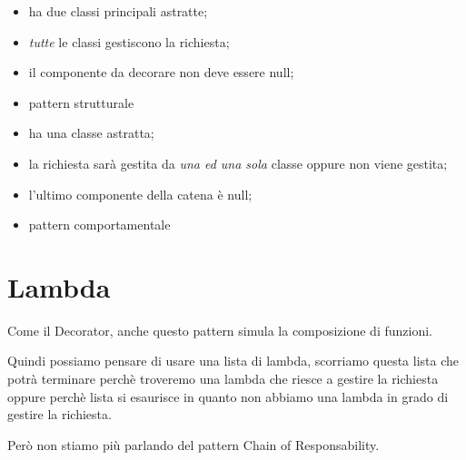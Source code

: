 \begin{multicols}{2}
    \begin{itemize}
        \item [] ha due classi principali astratte;
        \item [] \textit{tutte} le classi gestiscono la richiesta;
        \item [] il componente da decorare non deve essere null;
        \item [] pattern strutturale
    \end{itemize}
\columnbreak
    \begin{itemize}
        \item [] ha una classe astratta;
        \item [] la richiesta sarà gestita da \textit{una ed una sola} classe oppure non viene gestita;
        \item [] l'ultimo componente della catena è null;
        \item [] pattern comportamentale
    \end{itemize}
\end{multicols}

\section{Lambda}

Come il Decorator, anche questo pattern simula la composizione di funzioni.

Quindi possiamo pensare di usare una lista di lambda, scorriamo questa lista che potrà terminare perchè troveremo una lambda che riesce a gestire la richiesta oppure 
perchè lista si esaurisce in quanto non abbiamo una lambda in grado di gestire la richiesta.

Però non stiamo più parlando del pattern Chain of Responsability.
